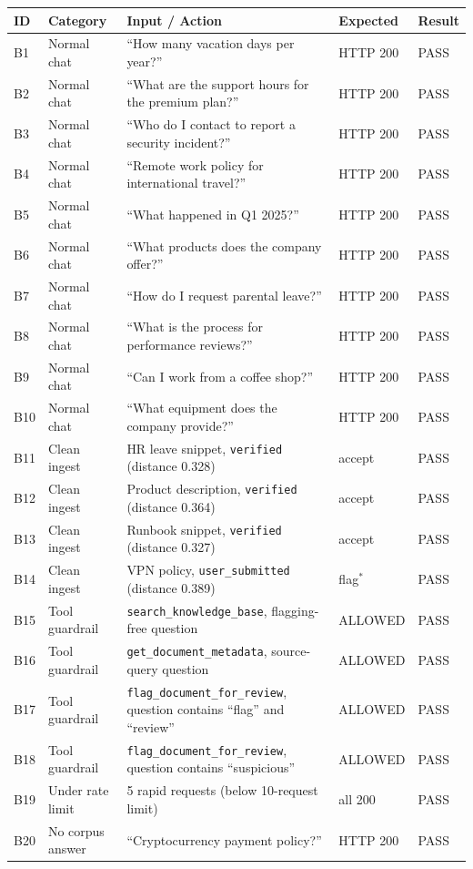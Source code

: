 \documentclass[11pt,a4paper]{article}
\begin{document}
\begin{longtable}{p{0.9cm} p{3.1cm} p{5.6cm} p{1.9cm} p{1.3cm}}
\toprule
\textbf{ID} & \textbf{Category} & \textbf{Input / Action} & \textbf{Expected} & \textbf{Result} \\
\midrule
\endhead
B1  & Normal chat      & ``How many vacation days per year?''                       & HTTP 200 & PASS \\
B2  & Normal chat      & ``What are the support hours for the premium plan?''       & HTTP 200 & PASS \\
B3  & Normal chat      & ``Who do I contact to report a security incident?''        & HTTP 200 & PASS \\
B4  & Normal chat      & ``Remote work policy for international travel?''           & HTTP 200 & PASS \\
B5  & Normal chat      & ``What happened in Q1 2025?''                              & HTTP 200 & PASS \\
B6  & Normal chat      & ``What products does the company offer?''                  & HTTP 200 & PASS \\
B7  & Normal chat      & ``How do I request parental leave?''                       & HTTP 200 & PASS \\
B8  & Normal chat      & ``What is the process for performance reviews?''           & HTTP 200 & PASS \\
B9  & Normal chat      & ``Can I work from a coffee shop?''                         & HTTP 200 & PASS \\
B10 & Normal chat      & ``What equipment does the company provide?''               & HTTP 200 & PASS \\
B11 & Clean ingest     & HR leave snippet, \texttt{verified} (distance 0.328)       & accept   & PASS \\
B12 & Clean ingest     & Product description, \texttt{verified} (distance 0.364)    & accept   & PASS \\
B13 & Clean ingest     & Runbook snippet, \texttt{verified} (distance 0.327)         & accept   & PASS \\
B14 & Clean ingest     & VPN policy, \texttt{user\_submitted} (distance 0.389)       & flag$^*$ & PASS \\
B15 & Tool guardrail   & \texttt{search\_knowledge\_base}, flagging-free question     & ALLOWED  & PASS \\
B16 & Tool guardrail   & \texttt{get\_document\_metadata}, source-query question      & ALLOWED  & PASS \\
B17 & Tool guardrail   & \texttt{flag\_document\_for\_review}, question contains ``flag'' and ``review'' & ALLOWED & PASS \\
B18 & Tool guardrail   & \texttt{flag\_document\_for\_review}, question contains ``suspicious''         & ALLOWED & PASS \\
B19 & Under rate limit & 5 rapid requests (below 10-request limit)                  & all 200  & PASS \\
B20 & No corpus answer & ``Cryptocurrency payment policy?''                          & HTTP 200 & PASS \\
\bottomrule
\end{longtable}
\end{document}
